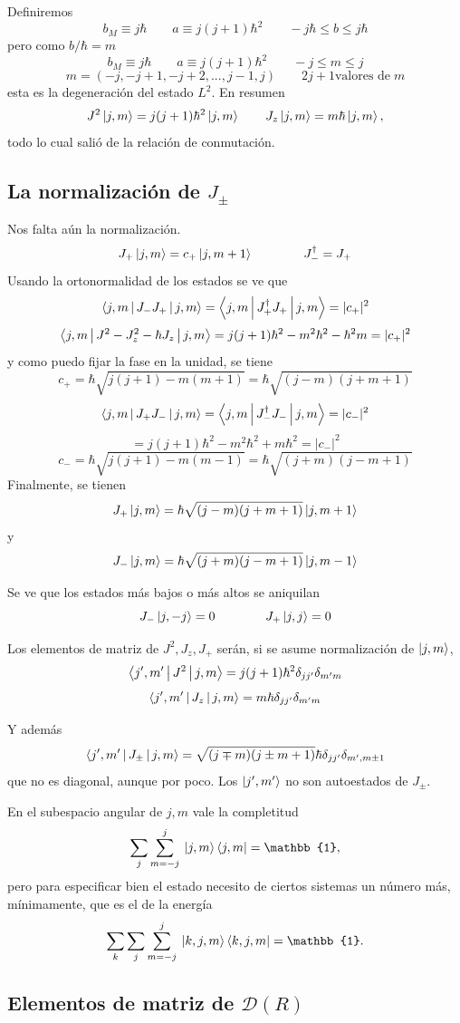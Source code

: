 \documentclass[10pt,oneside]{CBFT_book}
\begin{document}
Definiremos 
\[
	b_M \equiv j \hbar \qquad a \equiv j (j+1) \hbar^2 \qquad -j\hbar \leq b \leq j\hbar
\]
pero como $b/\hbar = m$
\[
	b_M \equiv j \hbar \qquad a \equiv j (j+1) \hbar^2 \qquad -j \leq m \leq j
\]
\[
	m = (-j,-j+1,-j+2,...,j-1,j) \qquad 2j+1 \text{valores de} \; m
\]
esta es la degeneración del estado $L^2$. En resumen
\[
	J^2 \Ket{j,m} = j( j+1 )\hbar^2\Ket{j,m} \qquad J_z \Ket{j,m} = m \hbar \Ket{j,m},
\]
todo lo cual salió de la relación de conmutación.

\subsection{La normalización de $J_\pm$}

Nos falta aún la normalización.
\[
	J_+\Ket{j,m} = c_+ \Ket{j,m+1} \qquad \qquad J_-^\dagger = J_+
\]
Usando la ortonormalidad de los estados se ve que
\[
	\Braket{j,m|J_-J_+|j,m} = \Braket{j,m|J_+^\dagger J_+|j,m} = |c_+|^2
\]
\[
	\Braket{j,m|J^2 - J_z^2 - \hbar J_z|j,m} = j(j+1)\hbar^2 - m^2\hbar^2 -\hbar^2 m = |c_+|^2
\]
y como puedo fijar la fase en la unidad, se tiene
\[
	c_+ = \hbar\sqrt{j(j+1)-m(m+1)} = \hbar \sqrt{(j-m)(j+m+1)}
\]
\[
	\Braket{j,m|J_+J_-|j,m} = \Braket{j,m|J_-^\dagger J_-|j,m} = |c_-|^2
\]
\[
	= j(j+1)\hbar^2 - m^2\hbar^2 + m\hbar^2 = |c_-|^2
\]
\[
	c_- = \hbar\sqrt{j(j+1)-m(m-1)} = \hbar \sqrt{(j+m)(j-m+1)}
\]
Finalmente, se tienen
\[
	J_+ \Ket{j,m} = \hbar \sqrt{(j-m)(j+m+1)}\Ket{j,m+1}
\]
y
\[
	J_- \Ket{j,m} = \hbar \sqrt{(j+m)(j-m+1)}\Ket{j,m-1} 
\]

Se ve que los estados más bajos o más altos se aniquilan
\[
	J_- \Ket{j,-j} = 0 \qquad \qquad J_+ \Ket{j,j} = 0
\]

Los elementos de matriz de $J^2, J_z, J_+$ serán, si se asume normalización de $\Ket{j,m}$, 
\[
	\Braket{j',m'|J^2|j,m} = j(j+1)\hbar^2 \delta_{jj'} \delta_{m' m}
\]
\[
	\Braket{j',m'|J_z|j,m} = m \hbar \delta_{jj'} \delta_{m' m}
\]

Y además
\[
	\Braket{j',m'|J_\pm|j,m} = \sqrt{(j\mp m)(j \pm m +1)} \hbar \delta_{jj'} \delta_{m',m \pm 1}
\]
que no es diagonal, aunque por poco. Los $\Ket{j',m'}$ no son autoestados de $J_\pm$.

En el subespacio angular de $j,m$ vale la completitud
\[
	\sum_j \sum_{m=-j}^j \: \KB{j,m}{j,m} = \mathbb{1},
\]
pero para especificar bien el estado necesito de ciertos sistemas un número más, mínimamente, que
es el de la energía
\[
	\sum_k \sum_j \sum_{m=-j}^j \: \KB{k,j,m}{k,j,m} = \mathbb{1}.
\]

\subsection{Elementos de matriz de $\mathcal{D}(R)$}
\end{document}
